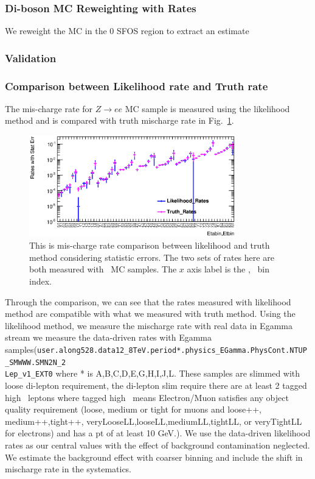 \subsubsection{Di-boson MC Reweighting with Rates}

We reweight the MC in the 0 SFOS region to extract an estimate

\subsubsection{Validation}


\subsubsection{Comparison between Likelihood rate and Truth rate}
   The mis-charge rate for $Z\rightarrow ee$ MC sample is measured
   using the likelihood method and is compared with truth mischarge
   rate in Fig.~\ref{fig:LL_Truth_Comparison}.

\begin{figure}[htp]
\centering
\includegraphics[width=0.8\textwidth]{figures/ChargeMisID/LL_TR_Com.eps}
\caption{This is mis-charge rate comparison between likelihood and
  truth method considering statistic errors. The two sets of rates
  here are both measured with \Zee\ MC samples. The $x$ axis label is
  the \eta, \pt\ bin index.}
\label{fig:LL_Truth_Comparison}
\end{figure}  

Through the comparison, we can see that the rates measured with
likelihood method are compatible with what we measured with truth
method. Using the likelihood method, we measure the mischarge rate
with real data in Egamma stream we measure the data-driven rates with
Egamma
samples(\texttt{user.along528.data12\_8TeV.period*.physics\_EGamma.PhysCont.NTUP\_SMWWW.SMN2N\_2\\Lep\_v1\_EXT0}
where * is A,B,C,D,E,G,H,I,J,L. These samples are slimmed with loose
di-lepton requirement, the di-lepton slim require there are at least 2
tagged high \pt\ leptons where tagged high \pt\ means Electron/Muon
satisfies any object quality requirement (loose, medium or tight for
muons and loose++,\\medium++,tight++,
veryLooseLL,looseLL,mediumLL,tightLL, or veryTightLL for electrons)
and has a pt of at least 10 GeV.). We use the data-driven likelihood
rates as our central values with the effect of background
contamination neglected. We estimate the background effect with
coarser binning and include the shift in mischarge rate in the
systematics.


